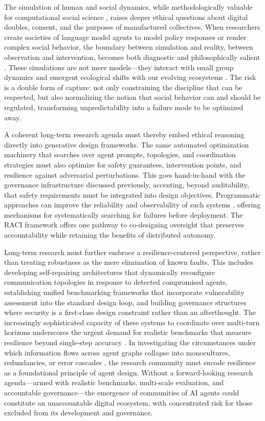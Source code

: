 \documentclass[11pt,a4paper]{article}
\begin{document}
The simulation of human and social dynamics, while methodologically valuable for computational social science \cite{arxiv:2411.03519v1}, raises deeper ethical questions about digital doubles, consent, and the purposes of manufactured collectives. When researchers create societies of language model agents to model policy responses or render complex social behavior, the boundary between simulation and reality, between observation and intervention, becomes both diagnostic and philosophically salient \cite{arxiv:2502.10978v2}. These simulations are not mere models---they interact with small group dynamics and emergent ecological shifts with our evolving ecosystems \cite{arxiv:2412.06681v2}. The risk is a double form of capture: not only constraining the discipline that can be respected, but also normalizing the notion that social behavior can and should be regulated, transforming unpredictability into a failure mode to be optimized away.

A coherent long-term research agenda must thereby embed ethical reasoning directly into generative design frameworks. The same automated optimization machinery that searches over agent prompts, topologies, and coordination strategies \cite{arxiv:2502.02533v2,arxiv:2503.03686v1} must also optimize for safety guarantees, intervention points, and resilience against adversarial perturbations. This goes hand-in-hand with the governance infrastructure discussed previously, accenting, beyond auditability, that safety requirements must be integrated into design objectives. Programmatic approaches can improve the reliability and observability of such systems \cite{arxiv:2601.00481v1,arxiv:2602.19843v1}, offering mechanisms for systematically searching for failures before deployment. The RACI framework \cite{arxiv:2505.04251v1} offers one pathway to co-designing oversight that preserves accountability while retaining the benefits of distributed autonomy.

Long-term research must further embrace a resilience-centered perspective, rather than treating robustness as the mere elimination of known faults. This includes developing self-repairing architectures that dynamically reconfigure communication topologies in response to detected compromised agents, establishing unified benchmarking frameworks that incorporate vulnerability assessment into the standard design loop, and building governance structures where security is a first-class design constraint rather than an afterthought. The increasingly sophisticated capacity of these systems to coordinate over multi-turn horizons underscores the urgent demand for realistic benchmarks that measure resilience beyond single-step accuracy \cite{arxiv:2603.01045v2}. In investigating the circumstances under which information flows across agent graphs collapse into monocultures, redundancies, or error cascades \cite{arxiv:2505.23352v1}, the research community must encode resilience as a foundational principle of agent design. Without a forward-looking research agenda---armed with realistic benchmarks, multi-scale evaluation, and accountable governance---the emergence of communities of AI agents could constitute an unaccountable digital ecosystem, with concentrated risk for those excluded from its development and governance.
\end{document}

